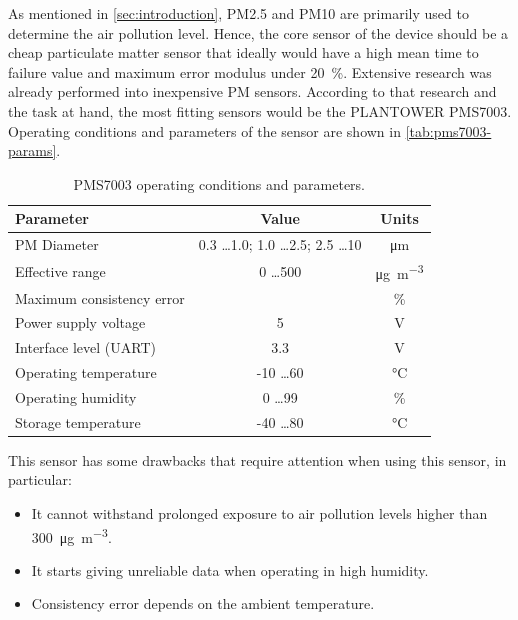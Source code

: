 \documentclass{article}
\begin{document}
			As mentioned in \autoref{sec:introduction}, PM2.5 and PM10 are primarily used to determine the air pollution level. Hence, the core sensor of the device should be a cheap particulate matter sensor that ideally would have a high mean time to failure value and maximum error modulus under \SI{20}{\percent}. Extensive research \cite{website:aqicn:sensors} was already performed into inexpensive PM sensors. According to that research and the task at hand, the most fitting sensors would be the PLANTOWER PMS7003. Operating conditions and parameters of the sensor are shown in \autoref{tab:pms7003-params}.
			
			\begin{table}[h]
				\begin{center}
					\caption{PMS7003 operating conditions and parameters.}
					\label{tab:pms7003-params}
					\begin{tabular}{l|c|c}
						\textbf{Parameter} & \textbf{Value} & \textbf{Units} \\
						\hline
						
						PM Diameter & 0.3 \ldots 1.0; 1.0 \ldots 2.5; 2.5 \ldots 10 & \si{\micro\meter} \\
						Effective range & 0 \ldots 500 & \si{\micro\gram\per\cubic\meter} \\
						Maximum consistency error & \textpm 15 & \% \\
						Power supply voltage & 5 & \si{\volt} \\
						Interface level (UART) & 3.3 & \si{\volt} \\
						Operating temperature & -10 \ldots 60 & \si{\celsius} \\
						Operating humidity & 0 \ldots 99 & \si{\percent} \\
						Storage temperature & -40 \ldots 80 & \si{\celsius} \\
					
					\end{tabular}
				\end{center}
			\end{table}
			
			This sensor has some drawbacks that require attention when using this sensor, in particular:
			\begin{itemize}
				\item It cannot withstand prolonged exposure to air pollution levels higher than \SI{300}{\micro\gram\per\cubic\meter}.
				\item It starts giving unreliable data when operating in high humidity.
				\item Consistency error depends on the ambient temperature.
			\end{itemize}
			
\end{document}

